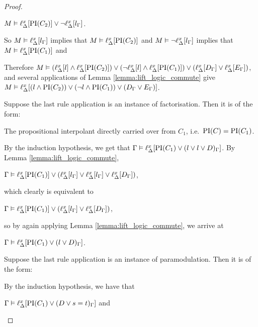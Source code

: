 \begin{proof}
\begin{indproof}
\begin{enumerate}
					$M \entails \lift{\Delta}{ \PI(C_2) }{x} \lor
					\lnot \lift{\Delta}{ l_\Gamma }{x}$.

					So $M \entails \lift{\Delta}{ l_\Gamma }{x}$ implies that 
					$M \entails \lift{\Delta}{\PI(C_2)}{x}$ and 
					$M \entails \lnot \lift{\Delta}{ l_\Gamma }{x}$  implies that 
					$M \entails \lift{\Delta}{\PI(C_1)}{x}$ and 

					Therefore
					$M\entails (\lif{l} \land \lif{\PI(C_2)}) \lor (\lnot \lif{l} \land \lif{\PI(C_1)}) \lor (\lif{D_\Gamma} \lor \lif{E_\Gamma}) $,
					and several applications of Lemma \ref{lemma:lift_logic_commute} give
					$M\entails \lif{(l \land \PI(C_2)) \lor (\lnot {l} \land {\PI(C_1)}) \lor ({D_\Gamma} \lor {E_\Gamma})} $.
			\end{enumerate}


		 Suppose the last rule application is an instance of factorisation. Then it is of the form:
			\begin{prooftree}
			\end{prooftree}

			The propositional interpolant directly carried over from $C_1$, i.e.~$\PI(C) = \PI(C_1)$.

			By the induction hypothesis, we get that $\Gamma \entails \lif{\PI(C_1) \lor (l \lor l \lor D)_\Gamma}$.
			By Lemma \ref{lemma:lift_logic_commute}, 

			$\Gamma \entails \lif{\PI(C_1)} \lor (\lif{l_\Gamma} \lor  \lif{l_\Gamma} \lor \lif{D_\Gamma})$,

			which clearly is equivalent to

			$\Gamma \entails \lif{\PI(C_1)} \lor (\lif{l_\Gamma} \lor \lif{D_\Gamma})$,

			so by again applying Lemma \ref{lemma:lift_logic_commute}, we arrive at

			$\Gamma \entails \lif{\PI(C_1) \lor (l \lor D)_\Gamma}$.



		 Suppose the last rule application is an instance of paramodulation. Then it is of the form:
			\begin{prooftree}
				\AxiomCm{C_1: D \lor s=t}
				\AxiomCm{C_2: E\occurat{s}{p}}
				\BinaryInfCm{C: D \lor E\occurat{t}{p}}
			\end{prooftree}

			By the induction hypothesis, we have that 

			$\Gamma \entails \lif{\PI(C_1) \lor (D \lor s=t)_\Gamma}$ and 


\end{indproof}
\end{proof}
